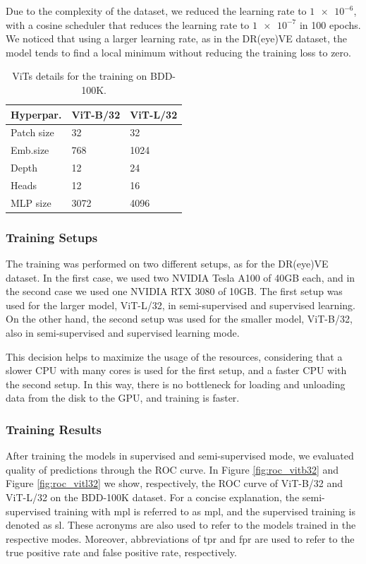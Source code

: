 Due to the complexity of the dataset, we reduced the learning rate to $\num{1e-6}$,
with a cosine scheduler that reduces the learning rate to $\num{1e-7}$ in 100 
epochs. We noticed that using a larger learning rate, as in the DR(eye)VE 
dataset, the model tends to find a local minimum without reducing the training 
loss to zero. 
\begin{table}
    \centering
    \begin{tabular}{lll}
    \hline
    \textbf{Hyperpar.} & \textbf{ViT-B/32} & \textbf{ViT-L/32} \\
    \hline
    Patch size & 32 & 32 \\
    \hline
    Emb.size & 768 & 1024 \\
    \hline
    Depth & 12 & 24 \\
    \hline
    Heads & 12 & 16 \\
    \hline
    MLP size & 3072 & 4096 \\
    \hline
    \end{tabular}
    \caption{ViTs details for the training on BDD-100K.}
    \label{tab:training_results}
\end{table}

\subsubsection{Training Setups}
The training was performed on two different setups, as for the DR(eye)VE dataset.
In the first case, we used two NVIDIA Tesla A100 of 40GB each, and in the second 
case we used one NVIDIA RTX 3080 of 10GB. The first setup was used for the larger 
model, ViT-L/32, in semi-supervised and supervised learning. On the other hand, 
the second setup was used for the smaller model, ViT-B/32, also in semi-supervised 
and supervised learning mode.

This decision helps to maximize the usage of the resources, considering that 
a slower CPU with many cores is used for the first setup, and a faster CPU with
the second setup. In this way, there is no bottleneck for loading and unloading 
data from the disk to the GPU, and training is faster.

\subsubsection{Training Results}
After training the models in supervised and semi-supervised mode, we evaluated 
quality of predictions through the ROC curve. 
In Figure \ref{fig:roc_vitb32} and Figure \ref{fig:roc_vitl32} we show, respectively, 
the ROC curve of ViT-B/32 and ViT-L/32 on the BDD-100K dataset.
For a concise explanation, the semi-supervised training with \acl{mpl} is 
referred to as \ac{mpl}, and the supervised training is denoted as \acs{sl}.
These acronyms are also used to refer to the models trained in the respective 
modes. Moreover, abbreviations of \acs{tpr} and \acs{fpr} are used to refer to 
the true positive rate and false positive rate, respectively.

